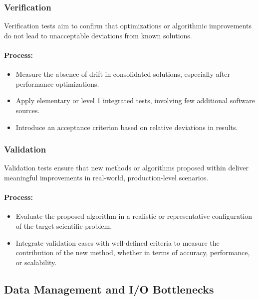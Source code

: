 \subsubsection{Verification}
\label{sec:verification}

Verification tests aim to confirm that optimizations or algorithmic improvements do not lead to unacceptable deviations from known solutions.

\paragraph{Process:}
\begin{itemize}
    \item Measure the absence of drift in consolidated solutions, especially after performance optimizations.
    \item Apply elementary or level 1 integrated tests, involving few additional software sources.
    \item Introduce an acceptance criterion based on relative deviations in results.
\end{itemize}

\subsubsection{Validation}
\label{sec:validation}

Validation tests ensure that new methods or algorithms proposed within \exama deliver meaningful improvements in real-world, production-level scenarios.

\paragraph{Process:}
\begin{itemize}
    \item Evaluate the proposed algorithm in a realistic or representative configuration of the target scientific problem.
    \item Integrate validation cases with well-defined criteria to measure the contribution of the new method, whether in terms of accuracy, performance, or scalability.
\end{itemize}

\subsection{Data Management and I/O Bottlenecks}
\label{sec:data-management}

